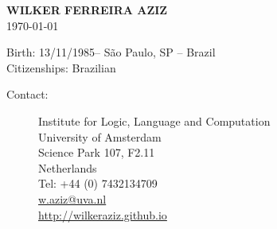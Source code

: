 \documentclass[10pt,a4paper,oneside]{article}
\makeatletter
\newcommand{\myname}{WILKER FERREIRA AZIZ\xspace}
\newcommand{\birthday}{13/11/1985\xspace}
\newcommand{\location}{S\~ao Paulo, SP -- Brazil\xspace}
\newcommand{\citizenships}{Brazilian\xspace}
\newcommand{\contact}{Institute for Logic, Language and Computation \\
University of Amsterdam \\
Science Park 107, F2.11 \\
Netherlands  \\
Tel: +44 (0) 7432134709 \\
\url{w.aziz@uva.nl} \\
\url{http://wilkeraziz.github.io} 
}
\makeatother
\begin{document}




\begin{center}
{\large \bf
\myname \\
}
{\small
\today \\
}
\end{center}

Birth: \birthday -- \location \\
Citizenships: \citizenships \\
\vspace{2mm}
\begin{description}
	\item[Contact:] \contact
\end{description}










\end{document}
